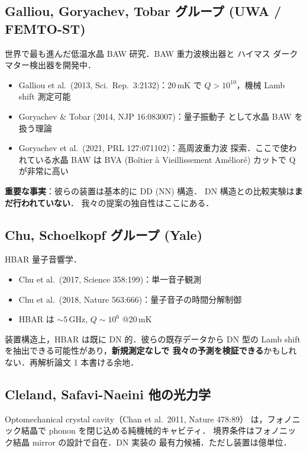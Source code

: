 \documentclass[11pt,a4paper]{article}
\begin{document}
\subsection{Galliou, Goryachev, Tobar グループ (UWA / FEMTO-ST)}

世界で最も進んだ低温水晶 BAW 研究．BAW 重力波検出器と
ハイマス ダークマター検出器を開発中．

\begin{itemize}
\item Galliou et al.\ (2013, Sci.\ Rep.\ 3:2132)：20\,mK で
$Q > 10^{10}$，機械 Lamb shift 測定可能
\item Goryachev \& Tobar (2014, NJP 16:083007)：量子振動子
として水晶 BAW を扱う理論
\item Goryachev et al.\ (2021, PRL 127:071102)：高周波重力波
探索．ここで使われている水晶 BAW は BVA (Boîtier à Vieillissement
Amélioré) カットで Q が非常に高い
\end{itemize}

\textbf{重要な事実}：彼らの装置は基本的に DD (NN) 構造．
DN 構造との比較実験は\textbf{まだ行われていない}．
我々の提案の独自性はここにある．

\subsection{Chu, Schoelkopf グループ (Yale)}

HBAR 量子音響学．

\begin{itemize}
\item Chu et al.\ (2017, Science 358:199)：単一音子観測
\item Chu et al.\ (2018, Nature 563:666)：量子音子の時間分解制御
\item HBAR は $\sim 5$\,GHz, $Q \sim 10^6$ @20\,mK
\end{itemize}

装置構造上，HBAR は既に DN 的．彼らの既存データから DN 型の
Lamb shift を抽出できる可能性があり，\textbf{新規測定なしで
我々の予測を検証できる}かもしれない．再解析論文 1 本書ける余地．

\subsection{Cleland, Safavi-Naeini 他の光力学}

Optomechanical crystal cavity（Chan et al.\ 2011, Nature 478:89）
は，フォノニック結晶で phonon を閉じ込める純機械的キャビティ．
境界条件はフォノニック結晶 mirror の設計で自在．DN 実装の
最有力候補．ただし装置は億単位．
\end{document}
